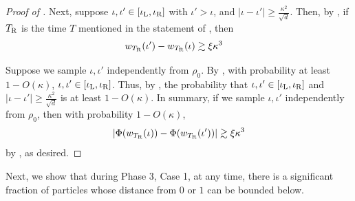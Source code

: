 \begin{proof}[Proof of ]
Next, suppose $\iota, \iota' \in [\iota_{\textup{L}}, \iota_{\textup{R}}]$ with $\iota' > \iota$, and $|\iota - \iota'| \geq \frac{\kappa^2}{\sqrt{d}}$. Then, by , if ${T_{\textup{R}}}$ is the time $T$ mentioned in the statement of , then 
\begin{align}
w_{{T_{\textup{R}}}}(\iota') - w_{{T_{\textup{R}}}}(\iota)
& \gtrsim \xi \kappa^3
\end{align}

Suppose we sample $\iota, \iota'$ independently from $\rho_0$. By , with probability at least $1 - O(\kappa)$, $\iota, \iota' \in [\iota_{\textup{L}}, \iota_{\textup{R}}]$. Thus, by , the probability that $\iota, \iota' \in [\iota_{\textup{L}}, \iota_{\textup{R}}]$ and $|\iota - \iota'| \geq \frac{\kappa^2}{\sqrt{d}}$ is at least $1 - O(\kappa)$. In summary, if we sample $\iota, \iota'$ independently from $\rho_0$, then with probability $1 - O(\kappa)$,
\begin{align}
|\Phi(w_{{T_{\textup{R}}}}(\iota)) - \Phi(w_{{T_{\textup{R}}}}(\iota'))| \gtrsim \xi \kappa^3
\end{align}
by , as desired.
\end{proof}

Next, we show that during Phase 3, Case 1, at any time, there is a significant fraction of particles whose distance from $0$ or $1$ can be bounded below.

